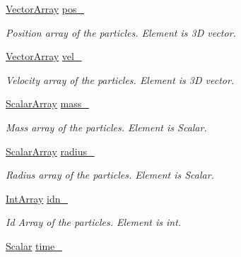 \begin{DoxyCompactItemize}
\item 
\mbox{\hyperlink{class_space_h_1_1_vel_indep_particles_aa9983058940249df8b00fa800e8cbad2}{Vector\+Array}} \mbox{\hyperlink{class_space_h_1_1_vel_indep_particles_af04a72a36cef0d27d243f2523a8d24b8}{pos\+\_\+}}
\begin{DoxyCompactList}\small\item\em Position array of the particles. Element is 3D vector. \end{DoxyCompactList}\item 
\mbox{\hyperlink{class_space_h_1_1_vel_indep_particles_aa9983058940249df8b00fa800e8cbad2}{Vector\+Array}} \mbox{\hyperlink{class_space_h_1_1_vel_indep_particles_a622d4b5407fb9612516f5c2da0a87f09}{vel\+\_\+}}
\begin{DoxyCompactList}\small\item\em Velocity array of the particles. Element is 3D vector. \end{DoxyCompactList}\item 
\mbox{\hyperlink{class_space_h_1_1_vel_indep_particles_ab5efeef52fb5748c25fbfeb04b64640e}{Scalar\+Array}} \mbox{\hyperlink{class_space_h_1_1_vel_indep_particles_a654dbb0f084532405e0a23e0b1fe92c2}{mass\+\_\+}}
\begin{DoxyCompactList}\small\item\em Mass array of the particles. Element is Scalar. \end{DoxyCompactList}\item 
\mbox{\hyperlink{class_space_h_1_1_vel_indep_particles_ab5efeef52fb5748c25fbfeb04b64640e}{Scalar\+Array}} \mbox{\hyperlink{class_space_h_1_1_vel_indep_particles_a114b2db596d038f80ec5f0bb52d9514c}{radius\+\_\+}}
\begin{DoxyCompactList}\small\item\em Radius array of the particles. Element is Scalar. \end{DoxyCompactList}\item 
\mbox{\hyperlink{class_space_h_1_1_vel_indep_particles_abe09426d740c8c2425c5fc3789c9c744}{Int\+Array}} \mbox{\hyperlink{class_space_h_1_1_vel_indep_particles_ab6aa82e238fe3af9835b7458db276b22}{idn\+\_\+}}
\begin{DoxyCompactList}\small\item\em Id Array of the particles. Element is int. \end{DoxyCompactList}\item 
\mbox{\hyperlink{class_space_h_1_1_vel_indep_particles_aeb47d8131b30ed790320ff634f0d6af1}{Scalar}} \mbox{\hyperlink{class_space_h_1_1_vel_indep_particles_af3b79520c5a15a82c391434c4f76d647}{time\+\_\+}}

\end{DoxyCompactItemize}
